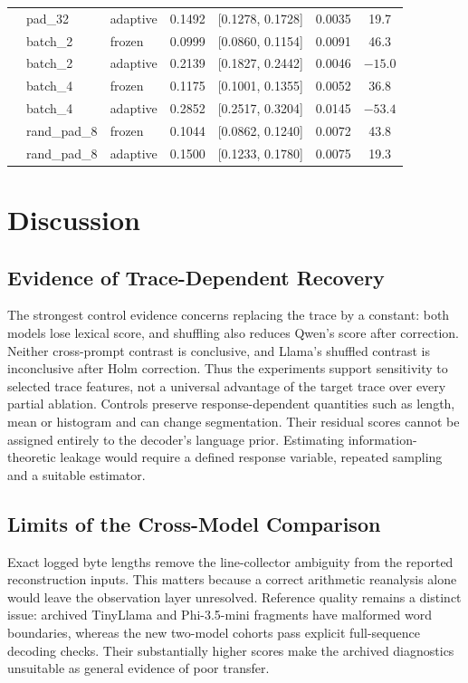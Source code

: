 \documentclass[electronics,article,submit,pdftex,moreauthors]{Definitions/mdpi}
\begin{document}
\begin{table}[ht]
{\begin{tabular}{l l l c c c c}
 & pad\_32 & adaptive & 0.1492 & [0.1278, 0.1728] & 0.0035 & 19.7 \\
 & batch\_2 & frozen & 0.0999 & [0.0860, 0.1154] & 0.0091 & 46.3 \\
 & batch\_2 & adaptive & 0.2139 & [0.1827, 0.2442] & 0.0046 & $-15.0$ \\
 & batch\_4 & frozen & 0.1175 & [0.1001, 0.1355] & 0.0052 & 36.8 \\
 & batch\_4 & adaptive & 0.2852 & [0.2517, 0.3204] & 0.0145 & $-53.4$ \\
 & rand\_pad\_8 & frozen & 0.1044 & [0.0862, 0.1240] & 0.0072 & 43.8 \\
 & rand\_pad\_8 & adaptive & 0.1500 & [0.1233, 0.1780] & 0.0075 & 19.3 \\
\bottomrule
\end{tabular}%
}
\end{table}

\section{Discussion}
\subsection{Evidence of Trace-Dependent Recovery}
The strongest control evidence concerns replacing the trace by a constant: both models lose lexical score, and shuffling also reduces Qwen's score after correction. Neither cross-prompt contrast is conclusive, and Llama's shuffled contrast is inconclusive after Holm correction. Thus the experiments support sensitivity to selected trace features, not a universal advantage of the target trace over every partial ablation. Controls preserve response-dependent quantities such as length, mean or histogram and can change segmentation. Their residual scores cannot be assigned entirely to the decoder's language prior. Estimating information-theoretic leakage would require a defined response variable, repeated sampling and a suitable estimator.

\subsection{Limits of the Cross-Model Comparison}
Exact logged byte lengths remove the line-collector ambiguity from the reported reconstruction inputs. This matters because a correct arithmetic reanalysis alone would leave the observation layer unresolved. Reference quality remains a distinct issue: archived TinyLlama and Phi-3.5-mini fragments have malformed word boundaries, whereas the new two-model cohorts pass explicit full-sequence decoding checks. Their substantially higher scores make the archived diagnostics unsuitable as general evidence of poor transfer.
\end{document}
